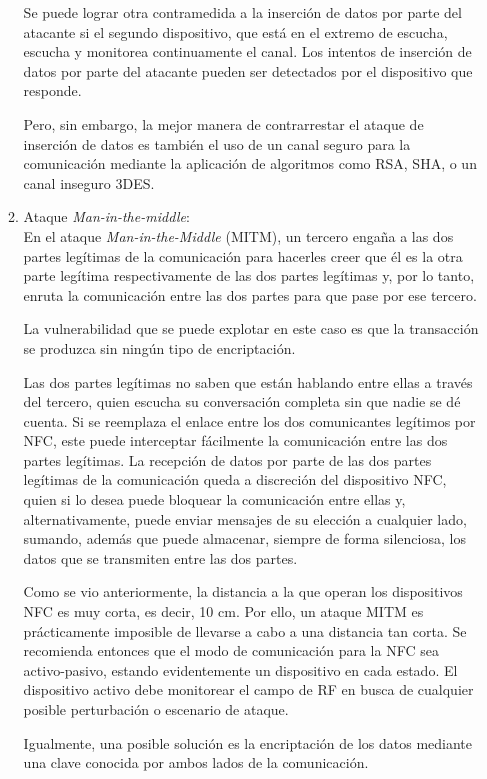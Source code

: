 \documentclass[12pt,a4paper,onecolumn,oneside]{report}
\begin{document}
\begin{enumerate}
\begin{enumerate}
Se puede lograr otra contramedida a la inserción de datos por parte del atacante si el segundo dispositivo, que está en el extremo de escucha, escucha y monitorea continuamente el canal. Los intentos de inserción de datos por parte del atacante pueden ser detectados por el dispositivo que responde. 

Pero, sin embargo, la mejor manera de contrarrestar el ataque de inserción de datos es también el uso de un canal seguro para la comunicación mediante la aplicación de algoritmos como RSA, SHA, o un canal inseguro 3DES.

\item Ataque \textit{Man-in-the-middle}:\\
En el ataque \textit{Man-in-the-Middle} (MITM), un tercero engaña a las dos partes legítimas de la comunicación para hacerles creer que él es la otra parte legítima respectivamente de las dos partes legítimas y, por lo tanto, enruta la comunicación entre las dos partes para que pase por ese tercero. 

La vulnerabilidad que se puede explotar en este caso es que la transacción se produzca sin ningún tipo de encriptación.

Las dos partes legítimas no saben que están hablando entre ellas a través del tercero, quien escucha su conversación completa sin que nadie se dé cuenta. Si se reemplaza el enlace entre los dos comunicantes legítimos por NFC, este puede interceptar fácilmente la comunicación entre las dos partes legítimas. La recepción de datos por parte de las dos partes legítimas de la comunicación queda a discreción del dispositivo NFC, quien si lo desea puede bloquear la comunicación entre ellas y, alternativamente, puede enviar mensajes de su elección a cualquier lado, sumando, además que puede almacenar, siempre de forma silenciosa,  los datos que se transmiten entre las dos partes.

Como se vio anteriormente, la distancia a la que operan los dispositivos NFC es muy corta, es decir, 10 cm. Por ello, un ataque MITM es prácticamente imposible de llevarse a cabo a una distancia tan corta. Se recomienda entonces que el modo de comunicación para la NFC sea activo-pasivo, estando evidentemente un dispositivo en cada estado. El dispositivo activo debe monitorear el campo de RF en busca de cualquier posible perturbación o escenario de ataque.

Igualmente, una posible solución es la encriptación de los datos mediante una clave conocida por ambos lados de la comunicación.



\end{enumerate}
\end{enumerate}
\end{document}
